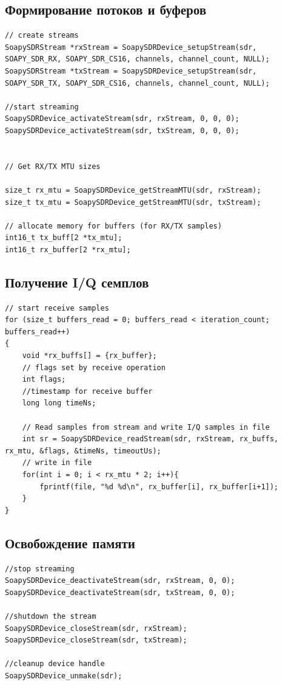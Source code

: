 \subsection{Формирование потоков и буферов}

\begin{lstlisting}
// create streams
SoapySDRStream *rxStream = SoapySDRDevice_setupStream(sdr, SOAPY_SDR_RX, SOAPY_SDR_CS16, channels, channel_count, NULL);
SoapySDRStream *txStream = SoapySDRDevice_setupStream(sdr, SOAPY_SDR_TX, SOAPY_SDR_CS16, channels, channel_count, NULL);

//start streaming
SoapySDRDevice_activateStream(sdr, rxStream, 0, 0, 0); 
SoapySDRDevice_activateStream(sdr, txStream, 0, 0, 0);


// Get RX/TX MTU sizes

size_t rx_mtu = SoapySDRDevice_getStreamMTU(sdr, rxStream);
size_t tx_mtu = SoapySDRDevice_getStreamMTU(sdr, txStream);

// allocate memory for buffers (for RX/TX samples)
int16_t tx_buff[2 *tx_mtu];
int16_t rx_buffer[2 *rx_mtu];
\end{lstlisting}


\subsection{Получение I/Q семплов}

\begin{lstlisting}
// start receive samples
for (size_t buffers_read = 0; buffers_read < iteration_count; buffers_read++)
{
    void *rx_buffs[] = {rx_buffer};
    // flags set by receive operation
    int flags;    
    //timestamp for receive buffer   
    long long timeNs; 
    
    // Read samples from stream and write I/Q samples in file
    int sr = SoapySDRDevice_readStream(sdr, rxStream, rx_buffs, rx_mtu, &flags, &timeNs, timeoutUs);
    // write in file
    for(int i = 0; i < rx_mtu * 2; i++){
        fprintf(file, "%d %d\n", rx_buffer[i], rx_buffer[i+1]);
    }
}
\end{lstlisting}

\subsection{Освобождение памяти}

\begin{lstlisting}
//stop streaming
SoapySDRDevice_deactivateStream(sdr, rxStream, 0, 0);
SoapySDRDevice_deactivateStream(sdr, txStream, 0, 0);

//shutdown the stream
SoapySDRDevice_closeStream(sdr, rxStream);
SoapySDRDevice_closeStream(sdr, txStream);

//cleanup device handle
SoapySDRDevice_unmake(sdr);
\end{lstlisting}

